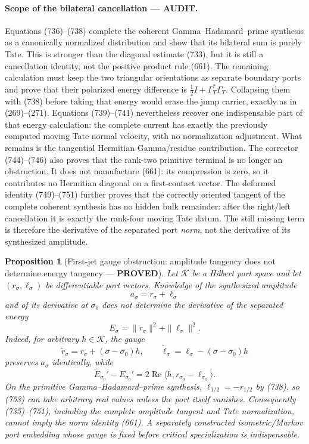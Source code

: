\documentclass[11pt]{article}
\newtheorem{proposition}[theorem]{Proposition}
\newcommand{\PROVED}{\textcolor{green!45!black}{\textbf{PROVED}}}
\newcommand{\AUDIT}{\textcolor{orange!75!black}{\textbf{AUDIT}}}
\begin{document}
\paragraph{Scope of the bilateral cancellation --- \AUDIT.}
Equations (736)--(738) complete the coherent Gamma--Hadamard--prime
synthesis as a canonically normalized distribution and show that its
bilateral sum is purely Tate.  This is stronger than the diagonal estimate
(733), but it is still a cancellation identity, not the positive product
rule (661).  The remaining calculation must keep the two triangular
orientations as separate boundary ports and prove that their polarized
energy difference is
\(\frac12I+\Gamma_T^*\Gamma_T\).  Collapsing them with (738) before taking
that energy would erase the jump carrier, exactly as in (269)--(271).
Equations (739)--(741) nevertheless recover one indispensable part of that
energy calculation: the complete current has exactly the previously
computed moving Tate normal velocity, with no normalization adjustment.
What remains is the tangential Hermitian Gamma/residue contribution.
The corrector (744)--(746) also proves that the rank-two primitive terminal
is no longer an obstruction.  It does not manufacture (661): its
compression is zero, so it contributes no Hermitian diagonal on a
first-contact vector.
The deformed identity (749)--(751) further proves that the correctly
oriented tangent of the complete coherent synthesis has no hidden bulk
remainder: after the right/left cancellation it is exactly the rank-four
moving Tate datum.  The still missing term is therefore the derivative of
the separated port \emph{norm}, not the derivative of its synthesized
amplitude.

\begin{proposition}[First-jet gauge obstruction: amplitude tangency does
not determine energy tangency --- \PROVED]
Let \(\mathcal K\) be a Hilbert port space and let
\((r_\sigma,\ell_\sigma)\) be differentiable port vectors.  Knowledge of
the synthesized amplitude
\[
 a_\sigma=r_\sigma+\ell_\sigma
\]
and of its derivative at \(\sigma_0\) does not determine the derivative of
the separated energy
\[
 E_\sigma=\|r_\sigma\|^2+\|\ell_\sigma\|^2.
\]
Indeed, for arbitrary \(h\in\mathcal K\), the gauge
\begin{equation}
 \widetilde r_\sigma
 =r_\sigma+(\sigma-\sigma_0)h,\qquad
 \widetilde\ell_\sigma
 =\ell_\sigma-(\sigma-\sigma_0)h                    \tag{752}
\end{equation}
preserves \(a_\sigma\) identically, while
\begin{equation}
 \widetilde E_{\sigma_0}'-E_{\sigma_0}'
 =2\operatorname{Re}
   \langle h,r_{\sigma_0}-\ell_{\sigma_0}\rangle.    \tag{753}
\end{equation}
On the primitive Gamma--Hadamard--prime synthesis,
\(\ell_{1/2}=-r_{1/2}\) by (738), so (753) can take arbitrary real values
unless the port itself vanishes.  Consequently (735)--(751), including the
complete amplitude tangent and Tate normalization, cannot imply the norm
identity (661).  A separately constructed isometric/Markov port embedding
whose gauge is fixed before critical specialization is indispensable.
\end{proposition}
\end{document}
